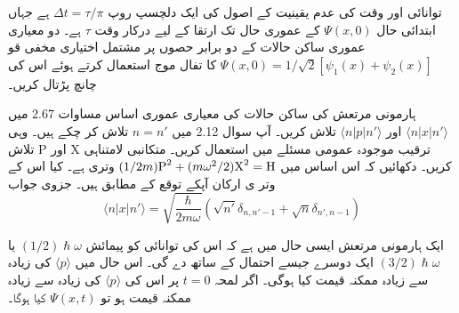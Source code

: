 

توانائی اور وقت کی عدم یقینیت کے اصول کی ایک دلچسپ روپ
\(\Delta t=\tau/\pi\)
ہے جہاں ابتدائی حال
\(\Psi (x,0)\)
کے عموری حال تک ارتقا کے لیے درکار وقت
\(\tau\)
ہے۔ دو معیاری عموری ساکن حالات کے دو برابر حصوں پر مشتمل اختیاری مخفی قو
\(\Psi(x,0)=1/\sqrt{2}[\psi_{1}(x)+\psi_{2}(x)]\)
کا تفال موج استعمال کرتے ہوئے اس کی چانچ پڑتال کریں۔

ہارمونی مرتعش کی ساکن حالات کی معیاری عموری اساس مساوات 2.67
میں
\(\langle n|x|n'\rangle\)
اور
\(\langle n|p|n'\rangle\)
تلاش کریں۔ آپ سوال 2.12 میں
\(n=n'\)
تلاش کر چکے ہیں۔ وہی ترقیب موجودہ عمومی مسئلے میں استعمال کریں۔ متکانبی لامتناہی
\(\text{X}\)
اور
\(\text{P}\)
تلاش کریں۔ دکھائیں کہ اس اساس میں
\((1/2m)\text{\text{P}}^{2}+(m\omega^{2}/2)\text{\text{X}}^{2}=\text{\text{H}}\)
وتری ہے۔ کیا اس کے وتر ی ارکان آپکے توقع کے مطابق ہیں۔
جزوی جواب
\[\langle n|x|n'\rangle=\sqrt{\frac{\hslash}{2m\omega}}(\sqrt{n'}\delta_{n,n'-1}+\sqrt{n}\delta_{n',n-1})\]

ایک ہارمونی مرتعش ایسی حال میں ہے کہ اس کی توانائی کو پیمائش
\((1/2)\hslash\omega\)
یا
\((3/2)\hslash\omega\)
ایک دوسرے جیسے احتمال کے ساتھ دے گی۔ اس حال میں
\(\langle p\rangle\)
کی زیادہ سے زیادہ ممکنہ قیمت کیا ہوگی۔ اگر لمحہ
\(t=0\)
پر اس کی
\(\langle p\rangle\)
کی زیادہ سے زیادہ ممکنہ قیمت ہو تو
\(\Psi(x,t)\)
کیا ہوگا۔

